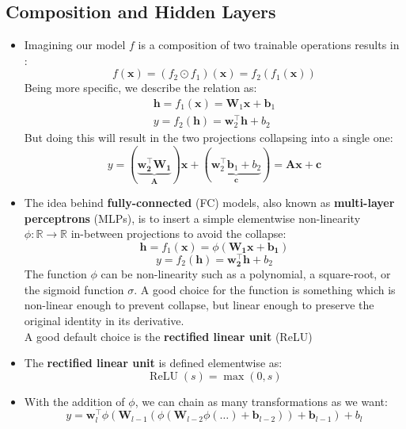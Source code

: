 \documentclass{article}
\newcommand{\tbf}[1]{\textbf{#1}}
\newcommand{\mbf}[1]{\mathbf{#1}}
\begin{document}
    \subsection{Composition and Hidden Layers}
    \begin{itemize}
        \item Imagining our model $f$ is a composition of two trainable operations results in : 
        \[f(\mbf{x}) = (f_2 \odot f_1)(\mbf{x}) = f_2(f_1(\mbf{x}))\]
        Being more specific, we describe the relation as:
        \begin{align*}
            \mbf{h} = f_1(\mbf{x}) = \mbf{W}_1\mbf{x} + \mbf{b}_1 \\
            y = f_2(\mbf{h}) = \mbf{w}_2^\top \mbf{h} + b_2
        \end{align*}
        But doing this will result in the two projections collapsing into a single one:
        \[y = (\underbrace{\mbf{w_2 ^\top \mbf{W}_1}}_{\mbf{A}}) \mbf{x} 
        + (\underbrace{\mbf{w}_2 ^\top \mbf{b}_1 + b_2}_{\mbf{c}}) 
        = \mbf{Ax+c}\]
        \item The idea behind \tbf{fully-connected} (FC) models, also known as \tbf{multi-layer perceptrons} (MLPs), is to insert a 
        simple elementwise non-linearity $\phi: \mathbb{R} \rightarrow \mathbb{R}$ in-between projections to avoid the collapse:
        \[\mbf{h} = f_1(\mbf{x}) = \phi(\mbf{W_1x + b_1})\]
        \[y = f_2(\mbf{h}) = \mbf{w_2 ^\top h} + b_2\]
        The function $\phi$ can be non-linearity such as a polynomial, a square-root, or the sigmoid function $\sigma$. 
        A good choice for the function is something which is non-linear enough to prevent collapse, but linear enough to preserve the original identity in its derivative. \\
    
        A good default choice is the \tbf{rectified linear unit} (ReLU)
        \item The \tbf{rectified linear unit} is defined elementwise as:
        \[\operatorname{ReLU}(s) = \operatorname{max}(0,s)\]
        \item With the addition of $\phi$, we can chain as many transformations as we want:
        \[y = \mbf{w}_l ^\top \phi (\mbf{W} _{l - 1}(\phi (\mbf{W}_{l-2} \phi (\hdots) + \mbf{b}_{l-2}))+\mbf{b}_{l-1})+b_l\]
        

    \end{itemize}
\end{document}
